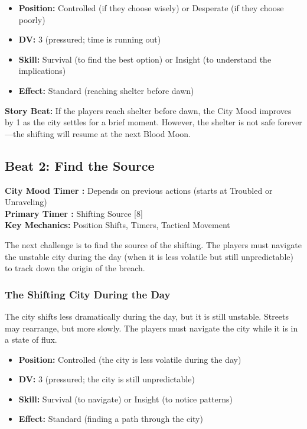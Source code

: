 \documentclass{article}
\begin{document}
\begin{itemize}
    \item \textbf{Position:} Controlled (if they choose wisely) or Desperate (if they choose poorly)
    \item \textbf{DV:} 3 (pressured; time is running out)
    \item \textbf{Skill:} Survival (to find the best option) or Insight (to understand the implications)
    \item \textbf{Effect:} Standard (reaching shelter before dawn)
\end{itemize}

\begin{storybox}
\textbf{Story Beat:} If the players reach shelter before dawn, the City Mood improves by 1 as the city settles for a brief moment. However, the shelter is not safe forever---the shifting will resume at the next Blood Moon.
\end{storybox}

\subsection{Beat 2: Find the Source}

\begin{mechanicbox}
\textbf{City Mood Timer :} Depends on previous actions (starts at Troubled or Unraveling) \\
\textbf{Primary Timer :} Shifting Source [8] \\
\textbf{Key Mechanics:} Position Shifts, Timers, Tactical Movement
\end{mechanicbox}

The next challenge is to find the source of the shifting. The players must navigate the unstable city during the day (when it is less volatile but still unpredictable) to track down the origin of the breach.

\subsubsection{The Shifting City During the Day}

The city shifts less dramatically during the day, but it is still unstable. Streets may rearrange, but more slowly. The players must navigate the city while it is in a state of flux.

\begin{itemize}
    \item \textbf{Position:} Controlled (the city is less volatile during the day)
    \item \textbf{DV:} 3 (pressured; the city is still unpredictable)
    \item \textbf{Skill:} Survival (to navigate) or Insight (to notice patterns)
    \item \textbf{Effect:} Standard (finding a path through the city)
\end{itemize}
\end{document}
